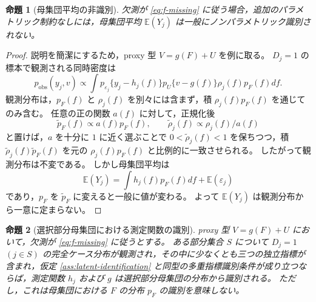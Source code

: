 \documentclass[dvipdfmx,autodetect-engine]{jsarticle}
\newtheorem{proposition}{命題}
\newcommand{\E}{\mathbb{E}}
\newcommand{\1}{\mathbf{1}}
\begin{document}
\begin{proposition}[母集団平均の非識別]
\label{prop:mean-nonid-f-missing}
欠測が \eqref{eq:f-missing} に従う場合，追加のパラメトリック制約なしには，母集団平均 $\E(Y_j)$ は一般にノンパラメトリック識別されない。
\end{proposition}

\begin{proof}
説明を簡潔にするため，proxy 型 $V=g(F)+U$ を例に取る。
$D_j=1$ の標本で観測される同時密度は
\begin{equation}
  p_{\mathrm{obs}}(y_j,v)
  \propto
  \int p_{\varepsilon_j}\{y_j-h_j(f)\}
       p_U\{v-g(f)\}
       \rho_j(f)p_F(f)df.
  \label{eq:selected-density}
\end{equation}
観測分布は，$p_F(f)$ と $\rho_j(f)$ を別々には含まず，積 $\rho_j(f)p_F(f)$ を通じてのみ含む。
任意の正の関数 $a(f)$ に対して，正規化後
\begin{equation}
  \widetilde p_F(f) \propto a(f)p_F(f),
  \qquad
  \widetilde \rho_j(f) \propto \rho_j(f)/a(f)
  \label{eq:tilt-nonid}
\end{equation}
と置けば，$a$ を十分に $1$ に近く選ぶことで $0<\widetilde\rho_j(f)<1$ を保ちつつ，積 $\widetilde\rho_j(f)\widetilde p_F(f)$ を元の $\rho_j(f)p_F(f)$ と比例的に一致させられる。
したがって観測分布は不変である。
しかし母集団平均は
\begin{equation}
  \E(Y_j)=\int h_j(f)p_F(f)df + \E(\varepsilon_j)
  \label{eq:population-mean-f}
\end{equation}
であり，$p_F$ を $\widetilde p_F$ に変えると一般に値が変わる。
よって $\E(Y_j)$ は観測分布から一意に定まらない。
\end{proof}

\begin{proposition}[選択部分母集団における測定関数の識別]
\label{prop:selected-function-id}
proxy 型 $V=g(F)+U$ において，欠測が \eqref{eq:f-missing} に従うとする。
ある部分集合 $S$ について $D_j=1$ $(j\in S)$ の完全ケース分布が観測され，その中に少なくとも三つの独立指標が含まれ，仮定 \ref{ass:latent-identification} と同型の多重指標識別条件が成り立つならば，測定関数 $h_j$ および $g$ は選択部分母集団の分布から識別される。
ただし，これは母集団における $F$ の分布 $p_F$ の識別を意味しない。
\end{proposition}
\end{document}
